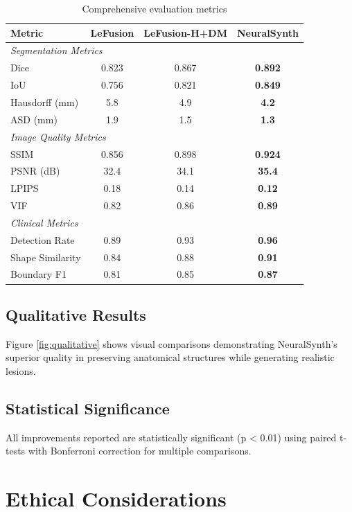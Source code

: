 \documentclass[10pt,twocolumn,letterpaper]{article}
\begin{document}
\begin{table}[h]
\centering
\caption{Comprehensive evaluation metrics}
\label{tab:comprehensive}
\small
\begin{tabular}{lccc}
\toprule
Metric & LeFusion & LeFusion-H+DM & NeuralSynth \\
\midrule
\multicolumn{4}{l}{\textit{Segmentation Metrics}} \\
Dice & 0.823 & 0.867 & \textbf{0.892} \\
IoU & 0.756 & 0.821 & \textbf{0.849} \\
Hausdorff (mm) & 5.8 & 4.9 & \textbf{4.2} \\
ASD (mm) & 1.9 & 1.5 & \textbf{1.3} \\
\midrule
\multicolumn{4}{l}{\textit{Image Quality Metrics}} \\
SSIM & 0.856 & 0.898 & \textbf{0.924} \\
PSNR (dB) & 32.4 & 34.1 & \textbf{35.4} \\
LPIPS & 0.18 & 0.14 & \textbf{0.12} \\
VIF & 0.82 & 0.86 & \textbf{0.89} \\
\midrule
\multicolumn{4}{l}{\textit{Clinical Metrics}} \\
Detection Rate & 0.89 & 0.93 & \textbf{0.96} \\
Shape Similarity & 0.84 & 0.88 & \textbf{0.91} \\
Boundary F1 & 0.81 & 0.85 & \textbf{0.87} \\
\bottomrule
\end{tabular}
\end{table}

\subsection{Qualitative Results}

Figure \ref{fig:qualitative} shows visual comparisons demonstrating NeuralSynth's superior quality in preserving anatomical structures while generating realistic lesions.

\subsection{Statistical Significance}

All improvements reported are statistically significant (p < 0.01) using paired t-tests with Bonferroni correction for multiple comparisons.

\section{Ethical Considerations}
\label{app:ethics}
\end{document}
